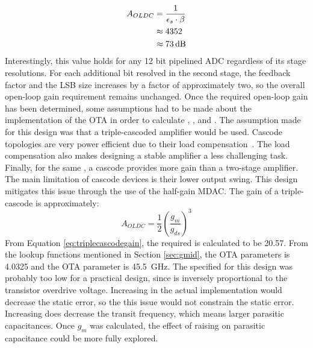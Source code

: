 \begin{align}
\label{eq:otagain}
A_{OLDC} &= \dfrac{1}{\epsilon_{s}\cdot\beta} \\
\nonu &\approx 4352 \\
\nonu &\approx \SI{73}{\decibel}
\end{align}
Interestingly, this value holds for any 12 bit pipelined ADC regardless of its stage resolutions. For each additional bit resolved in the second stage, the feedback factor and the LSB size increases by a factor of approximately two, so the overall open-loop gain requirement remains unchanged. Once the required open-loop gain has been determined, some assumptions had to be made about the implementation of the OTA in order to calculate \gmgds, \gmid, and \transit. The assumption made for this design was that a triple-cascoded amplifier would be used. Cascode topologies are very power efficient due to their load compensation~\cite{5595209}. The load compensation also makes designing a stable amplifier a less challenging task. Finally, for the same \gmgds, a cascode provides more gain than a two-stage amplifier. The main limitation of cascode devices is their lower output swing. This design mitigates this issue through the use of the half-gain MDAC. The gain of a triple-cascode is approximately:
\begin{equation}
\label{eq:triplecascodegain}
A_{OLDC} = \dfrac{1}{2}\left(\dfrac{g_{m}}{g_{ds}}\right)^{3}
\end{equation}
From Equation \ref{eq:triplecascodegain}, the required \gmgds\spc is calculated to be 20.57. From the \gmid\spc lookup functions mentioned in Section \ref{sec:gmid}, the \gmid\spc OTA parameters is 4.0325 and the \transit\spc OTA parameter is \SI{45.5}{\giga\hertz}. The \gmid\spc specified for this design was probably too low for a practical design, since \gmid\spc is inversely proportional to the transistor overdrive voltage. Increasing \gmid\spc in the actual implementation would decrease the static error, so the this issue would not constrain the static error. Increasing \gmid\spc does decrease the transit frequency, which means larger parasitic capacitances. Once $g_{m}$ was calculated, the effect of raising \gmid\spc on parasitic capacitance could be more fully explored.

